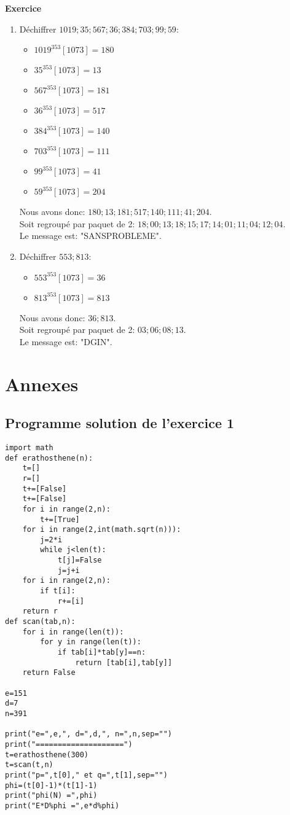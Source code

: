 \documentclass[10pt,a4paper,french]{article}
\newcounter{exercice}[section]
\newenvironment{exercice}[1][]{\refstepcounter{exercice}\par\medskip
   \noindent \textbf{Exercice~\theexercice #1} \rmfamily}{\medskip}
\begin{document}
\begin{exercice}
\begin{enumerate}
\item Déchiffrer $1019;35;567;36;384;703;99;59$:
\begin{itemize}
\item $1019^{353}[1073]=180$
\item $35^{353}[1073]=13$
\item $567^{353}[1073]=181$
\item $36^{353}[1073]=517$
\item $384^{353}[1073]=140$
\item $703^{353}[1073]=111$
\item $99^{353}[1073]=41$
\item $59^{353}[1073]=204$
\end{itemize}
Nous avons donc: $180;13;181;517;140;111;41;204$.\\
Soit regroupé par paquet de 2: $18;00;13;18;15;17;14;01;11;04;12;04$.\\
Le message est: "SANSPROBLEME".

\item Déchiffrer $553;813$:
\begin{itemize}
\item $553^{353}[1073]=36$
\item $813^{353}[1073]=813$

\end{itemize}
Nous avons donc: $36;813$.\\
Soit regroupé par paquet de 2: $03;06;08;13$.\\
Le message est: "DGIN".
\end{enumerate}
\end{exercice}
\section{Annexes}
\subsection{Programme solution de l'exercice 1}\label{exo1}
\begin{lstlisting}
import math
def erathosthene(n):
    t=[]
    r=[]
    t+=[False]
    t+=[False]
    for i in range(2,n):
        t+=[True]
    for i in range(2,int(math.sqrt(n))):
        j=2*i
        while j<len(t):
            t[j]=False
            j=j+i
    for i in range(2,n):
        if t[i]:
            r+=[i]
    return r
def scan(tab,n):
    for i in range(len(t)):
        for y in range(len(t)):
            if tab[i]*tab[y]==n:
                return [tab[i],tab[y]]
    return False

e=151
d=7
n=391

print("e=",e,", d=",d,", n=",n,sep="")
print("====================")
t=erathosthene(300)
t=scan(t,n)
print("p=",t[0]," et q=",t[1],sep="")
phi=(t[0]-1)*(t[1]-1)
print("phi(N) =",phi)
print("E*D%phi =",e*d%phi)
\end{lstlisting}
\end{document}
